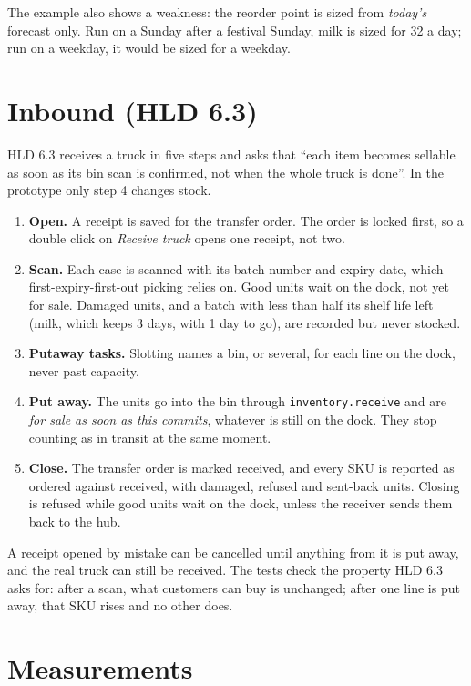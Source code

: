 The example also shows a weakness: the reorder point is sized from \emph{today's} forecast only. Run on a Sunday after
a festival Sunday, milk is sized for 32 a day; run on a weekday, it would be sized for a weekday.

\section{Inbound (HLD 6.3)}
\label{sec:m3-inbound}

HLD 6.3 receives a truck in five steps and asks that ``each item becomes sellable as soon as its bin scan is
confirmed, not when the whole truck is done''. In the prototype only step 4 changes stock.

\begin{enumerate}
  \item \textbf{Open.} A receipt is saved for the transfer order. The order is locked first, so a double click on
    \emph{Receive truck} opens one receipt, not two.
  \item \textbf{Scan.} Each case is scanned with its batch number and expiry date, which first-expiry-first-out
    picking relies on. Good units wait on the dock, not yet for sale. Damaged units, and a batch with less than half
    its shelf life left (milk, which keeps 3 days, with 1 day to go), are recorded but never stocked.
  \item \textbf{Putaway tasks.} Slotting names a bin, or several, for each line on the dock, never past capacity.
  \item \textbf{Put away.} The units go into the bin through \texttt{inventory.receive} and are \emph{for sale as soon
    as this commits}, whatever is still on the dock. They stop counting as in transit at the same moment.
  \item \textbf{Close.} The transfer order is marked received, and every SKU is reported as ordered against received,
    with damaged, refused and sent-back units. Closing is refused while good units wait on the dock, unless the
    receiver sends them back to the hub.
\end{enumerate}

A receipt opened by mistake can be cancelled until anything from it is put away, and the real truck can still be
received. The tests check the property HLD 6.3 asks for: after a scan, what customers can buy is unchanged; after one
line is put away, that SKU rises and no other does.

\section{Measurements}
\label{sec:m3-results}

